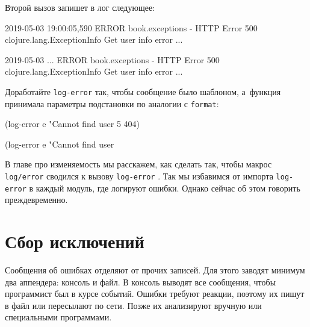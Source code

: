 Второй вызов запишет в лог следующее:

\ifnarrow

\begin{english}
  \begin{text}
2019-05-03 19:00:05,590 ERROR
book.exceptions - HTTP Error 500
clojure.lang.ExceptionInfo
  Get user info error
  ...
  \end{text}
\end{english}

\else

\begin{english}
  \begin{text}
2019-05-03 ... ERROR book.exceptions - HTTP Error 500
clojure.lang.ExceptionInfo
  Get user info error
  ...
  \end{text}
\end{english}

\fi

Доработайте \verb|log-error| так, чтобы сообщение было шаблоном, а~функция
принимала параметры подстановки по аналогии с \verb|format|:

\ifnarrow

\begin{english}
  \begin{clojure}
(log-error e
  "Cannot find user %
  5 404)
  \end{clojure}
\end{english}

\else

\begin{english}
  \begin{clojure}
(log-error e "Cannot find user %
  \end{clojure}
\end{english}

\fi

В главе про изменяемость мы расскажем, как сделать так, чтобы макрос
\verb|log/error| сводился к вызову \verb|log-error| .  Так
мы избавимся от импорта \verb|log-error| в каждый модуль, где логируют ошибки.
Однако сейчас об этом говорить преждевременно.

\section{Сбор исключений}


Сообщения об ошибках отделяют от прочих записей. Для этого заводят минимум два
аппендера: консоль и файл. В консоль выводят все сообщения, чтобы программист
был в курсе событий. Ошибки требуют реакции, поэтому их пишут в файл или
пересылают по сети. Позже их анализируют вручную или специальными программами.

